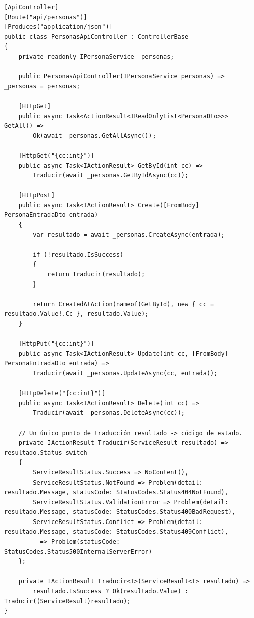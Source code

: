 \documentclass[12pt,letterpaper]{article}
\begin{document}
\begin{lstlisting}[language=CSharpX,caption={Fragmento de \texttt{Back/01-Borde/ControllersApi/PersonasApiController.cs} (sin los comentarios XML).}]
[ApiController]
[Route("api/personas")]
[Produces("application/json")]
public class PersonasApiController : ControllerBase
{
    private readonly IPersonaService _personas;

    public PersonasApiController(IPersonaService personas) => _personas = personas;

    [HttpGet]
    public async Task<ActionResult<IReadOnlyList<PersonaDto>>> GetAll() =>
        Ok(await _personas.GetAllAsync());

    [HttpGet("{cc:int}")]
    public async Task<IActionResult> GetById(int cc) =>
        Traducir(await _personas.GetByIdAsync(cc));

    [HttpPost]
    public async Task<IActionResult> Create([FromBody] PersonaEntradaDto entrada)
    {
        var resultado = await _personas.CreateAsync(entrada);

        if (!resultado.IsSuccess)
        {
            return Traducir(resultado);
        }

        return CreatedAtAction(nameof(GetById), new { cc = resultado.Value!.Cc }, resultado.Value);
    }

    [HttpPut("{cc:int}")]
    public async Task<IActionResult> Update(int cc, [FromBody] PersonaEntradaDto entrada) =>
        Traducir(await _personas.UpdateAsync(cc, entrada));

    [HttpDelete("{cc:int}")]
    public async Task<IActionResult> Delete(int cc) =>
        Traducir(await _personas.DeleteAsync(cc));

    // Un único punto de traducción resultado -> código de estado.
    private IActionResult Traducir(ServiceResult resultado) => resultado.Status switch
    {
        ServiceResultStatus.Success => NoContent(),
        ServiceResultStatus.NotFound => Problem(detail: resultado.Message, statusCode: StatusCodes.Status404NotFound),
        ServiceResultStatus.ValidationError => Problem(detail: resultado.Message, statusCode: StatusCodes.Status400BadRequest),
        ServiceResultStatus.Conflict => Problem(detail: resultado.Message, statusCode: StatusCodes.Status409Conflict),
        _ => Problem(statusCode: StatusCodes.Status500InternalServerError)
    };

    private IActionResult Traducir<T>(ServiceResult<T> resultado) =>
        resultado.IsSuccess ? Ok(resultado.Value) : Traducir((ServiceResult)resultado);
}
\end{lstlisting}
\end{document}
